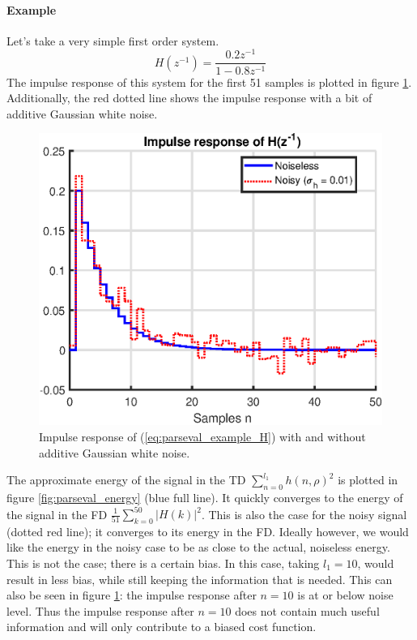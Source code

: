 \paragraph{Example}
Let's take a very simple first order system.
\begin{equation}
    H(z^{-1}) = \frac{0.2 z^{-1}}{1 - 0.8 z^{-1}}
    \label{eq:parseval_example_H}
\end{equation}
The impulse response of this system for the first 51 samples is plotted in figure \ref{fig:parseval_signal}. Additionally, the red dotted line shows the impulse response with a bit of additive Gaussian white noise.

\begin{figure}[H]
    \centering
    \includegraphics[width = 0.65 \textwidth]{figures/parseval_signal.eps}
    \caption{Impulse response of (\ref{eq:parseval_example_H}) with and without additive Gaussian white noise.}
    \label{fig:parseval_signal}
\end{figure}

The approximate energy of the signal in the TD $\sum_{n=0}^{l_1} h(n,\rho)^2$ is plotted in figure \ref{fig:parseval_energy} (blue full line). It quickly converges to the energy of the signal in the FD $\frac{1}{51} \sum_{k=0}^{50} |H(k)|^2$. This is also the case for the noisy signal (dotted red line); it converges to its energy in the FD. Ideally however, we would like the energy in the noisy case to be as close to the actual, noiseless energy. This is not the case; there is a certain bias. In this case, taking $l_1 = 10$, would result in less bias, while still keeping the information that is needed. This can also be seen in figure \ref{fig:parseval_signal}: the impulse response after $n = 10$ is at or below noise level. Thus the impulse response after $n = 10$ does not contain much useful information and will only contribute to a biased cost function.

